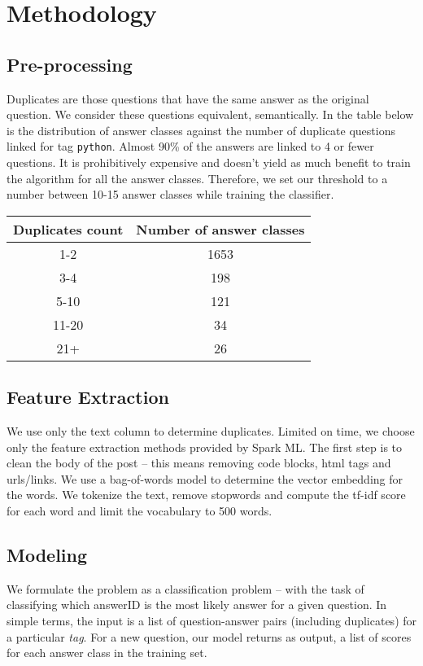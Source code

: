 \documentclass{article}
\begin{document}
\section{Methodology}
\subsection{Pre-processing}
Duplicates are those questions that have the same answer as the original question. We consider these questions equivalent, semantically. In the table below is the distribution of answer classes against the number of duplicate questions linked for tag \texttt{python}. Almost 90\% of the answers are linked to 4 or fewer questions. It is prohibitively expensive and doesn't yield as much benefit to train the algorithm for all the answer classes. Therefore, we set our threshold to a number between 10-15 answer classes while training the classifier.

\begin{center}
	\begin{tabular}
		{|c c|} 
		\hline
		Duplicates count & Number of answer classes\\ 
		\hline\hline
		1-2 & 1653 \\ 
		\hline
		3-4 & 198 \\
		\hline
		5-10 & 121 \\
		\hline
		11-20 & 34 \\
		\hline
		21+ & 26 \\
		\hline
	\end{tabular}
\end{center}

\subsection{Feature Extraction}
We use only the text column to determine duplicates. Limited on time, we choose only the feature extraction methods provided by Spark ML. The first step is to clean the body of the post -- this means removing code blocks, html tags and urls/links. We use a bag-of-words model to determine the vector embedding for the words. We tokenize the text, remove stopwords and compute the tf-idf score for each word and limit the vocabulary to 500 words.

\subsection{Modeling}
We formulate the problem as a classification problem -- with the task of classifying which answerID is the most likely answer for a given question. In simple terms, the input is a list of question-answer pairs (including duplicates) for a particular \textit{tag}. For a new question, our model returns as output, a list of scores for each answer class in the training set.\\
\end{document}
